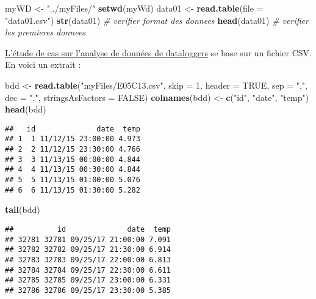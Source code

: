 \documentclass[]{book}
\newenvironment{Shaded}{\begin{snugshade}}{\end{snugshade}}
\newcommand{\KeywordTok}[1]{\textcolor[rgb]{0.13,0.29,0.53}{\textbf{#1}}}
\newcommand{\DataTypeTok}[1]{\textcolor[rgb]{0.13,0.29,0.53}{#1}}
\newcommand{\DecValTok}[1]{\textcolor[rgb]{0.00,0.00,0.81}{#1}}
\newcommand{\StringTok}[1]{\textcolor[rgb]{0.31,0.60,0.02}{#1}}
\newcommand{\CommentTok}[1]{\textcolor[rgb]{0.56,0.35,0.01}{\textit{#1}}}
\newcommand{\OtherTok}[1]{\textcolor[rgb]{0.56,0.35,0.01}{#1}}
\newcommand{\NormalTok}[1]{#1}
\theoremstyle{definition}
\theoremstyle{definition}
\theoremstyle{definition}
\theoremstyle{remark}
\begin{document}
\begin{Shaded}
\begin{Highlighting}[]
\NormalTok{myWD <-}\StringTok{ "../myFiles/"}
\KeywordTok{setwd}\NormalTok{(myWd)}
\NormalTok{data01 <-}\StringTok{ }\KeywordTok{read.table}\NormalTok{(}\DataTypeTok{file =} \StringTok{"data01.csv"}\NormalTok{)}
\KeywordTok{str}\NormalTok{(data01) }\CommentTok{# verifier format des donnees}
\KeywordTok{head}\NormalTok{(data01) }\CommentTok{# verifier les premieres donnees}
\end{Highlighting}
\end{Shaded}

\protect\hyperlink{studyCase001}{L'étude de cas sur l'analyse de données
de dataloggers} se base sur un fichier CSV. En voici un extrait :

\begin{Shaded}
\begin{Highlighting}[]
\NormalTok{bdd <-}\StringTok{ }\KeywordTok{read.table}\NormalTok{(}\StringTok{"myFiles/E05C13.csv"}\NormalTok{, }\DataTypeTok{skip =} \DecValTok{1}\NormalTok{, }\DataTypeTok{header =} \OtherTok{TRUE}\NormalTok{, }
  \DataTypeTok{sep =} \StringTok{","}\NormalTok{, }\DataTypeTok{dec =} \StringTok{"."}\NormalTok{, }\DataTypeTok{stringsAsFactors =} \OtherTok{FALSE}\NormalTok{)}
\KeywordTok{colnames}\NormalTok{(bdd) <-}\StringTok{ }\KeywordTok{c}\NormalTok{(}\StringTok{"id"}\NormalTok{, }\StringTok{"date"}\NormalTok{, }\StringTok{"temp"}\NormalTok{)}
\KeywordTok{head}\NormalTok{(bdd)}
\end{Highlighting}
\end{Shaded}

\begin{verbatim}
##   id              date  temp
## 1  1 11/12/15 23:00:00 4.973
## 2  2 11/12/15 23:30:00 4.766
## 3  3 11/13/15 00:00:00 4.844
## 4  4 11/13/15 00:30:00 4.844
## 5  5 11/13/15 01:00:00 5.076
## 6  6 11/13/15 01:30:00 5.282
\end{verbatim}

\begin{Shaded}
\begin{Highlighting}[]
\KeywordTok{tail}\NormalTok{(bdd)}
\end{Highlighting}
\end{Shaded}

\begin{verbatim}
##          id              date  temp
## 32781 32781 09/25/17 21:00:00 7.091
## 32782 32782 09/25/17 21:30:00 6.914
## 32783 32783 09/25/17 22:00:00 6.813
## 32784 32784 09/25/17 22:30:00 6.611
## 32785 32785 09/25/17 23:00:00 6.331
## 32786 32786 09/25/17 23:30:00 5.385
\end{verbatim}
\end{document}
